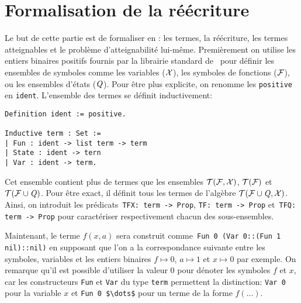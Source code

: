 \section{Formalisation de la réécriture}
\label{sec:rewriting}

Le but de cette partie est de formaliser en \coq: les termes, la
réécriture, les termes atteignables et le problème d'atteignabilité
lui-même.  Premièrement on utilise les entiers binaires positifs
fournis par la librairie standard de \coq\ pour définir les ensembles de
symboles comme les variables ($\mathcal X$), les symboles de fonctions
($\mathcal{F}$), ou les ensembles d'états ($\mathit Q$). 
Pour être plus explicite, on renomme les \lstinline!positive!
en \lstinline!ident!. L'ensemble des termes se définit inductivement:

\switchlstcoq
\begin{lstlisting}
Definition ident := positive.

Inductive term : Set :=
| Fun : ident -> list term -> term
| State : ident -> tern
| Var : ident -> term.
\end{lstlisting}

Cet ensemble contient plus de termes que les ensembles $\mathcal{T(F, X)}$, $\mathcal{T(F)}$ et $\mathcal{ T(F \cup \mathit Q)}$.
Pour être exact, il définit tous les termes de l'algèbre $\mathcal{ T(F \cup \mathit Q, X)}$.
Ainsi, on introduit les prédicats~\lstinline!TFX: term -> Prop!, \lstinline!TF: term -> Prop!
et~\lstinline!TFQ: term -> Prop! pour caractériser respectivement chacun des sous-ensembles.

Maintenant, le terme $f(x, a)$ sera construit comme~\lstinline!Fun 0 (Var 0::(Fun 1 nil)::nil)!
en supposant que l'on a la correspondance suivante entre les symboles,
variables et les entiers binaires $f \mapsto 0$, $a \mapsto 1$ et $x
\mapsto 0$ par exemple.  On remarque qu'il est possible d'utiliser 
la valeur $0$ pour dénoter les symboles $f$ et $x$, car les constructeurs
\lstinline!Fun! et \lstinline!Var! du type \lstinline!term! permettent la distinction:
\lstinline!Var 0! pour la variable $x$ et \lstinline!Fun 0 $\dots$! pour un terme de la forme $f(\dots)$.

